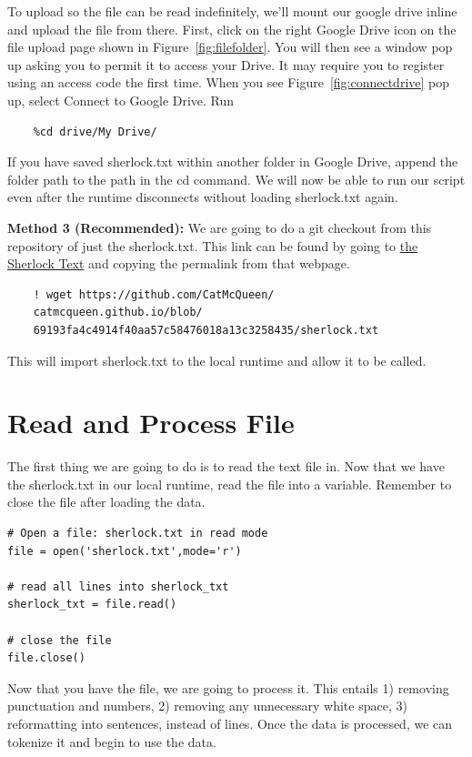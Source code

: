 \documentclass{article}
\begin{document}
To upload so the file can be read indefinitely, we'll mount our google drive inline and upload the file from there. First, click on the right Google Drive icon on the file upload page shown in Figure~\ref{fig:filefolder}. You will then see a window pop up asking you to permit it to access your Drive. It may require you to register using an access code the first time. When you see Figure~\ref{fig:connectdrive} pop up, select Connect to Google Drive. Run

\begin{verbatim}
    %cd drive/My Drive/
\end{verbatim}

If you have saved sherlock.txt within another folder in Google Drive, append the folder path to the path in the cd command. We will now be able to run our script even after the runtime disconnects without loading sherlock.txt again.

\textbf{Method 3 (Recommended):}
We are going to do a git checkout from this repository of just the sherlock.txt. This link can be found by going to \href{https://github.com/CatMcQueen/catmcqueen.github.io/blob/main/sherlock.txt}{the Sherlock Text} and copying the permalink from that webpage.

\begin{verbatim}
    ! wget https://github.com/CatMcQueen/
    catmcqueen.github.io/blob/
    69193fa4c4914f40aa57c58476018a13c3258435/sherlock.txt
\end{verbatim}

This will import sherlock.txt to the local runtime and allow it to be called.

\section{Read and Process File}
The first thing we are going to do is to read the text file in. Now that we have the sherlock.txt in our local runtime, read the file into a variable. Remember to close the file after loading the data.

\begin{verbatim}
# Open a file: sherlock.txt in read mode
file = open('sherlock.txt',mode='r')
 
# read all lines into sherlock_txt
sherlock_txt = file.read()
 
# close the file
file.close()
\end{verbatim}

Now that you have the file, we are going to process it. This entails
1) removing punctuation and numbers, 2) removing any unnecessary white space, 3) reformatting into sentences, instead of lines. Once the data is processed, we can tokenize it and begin to use the data.
\end{document}
